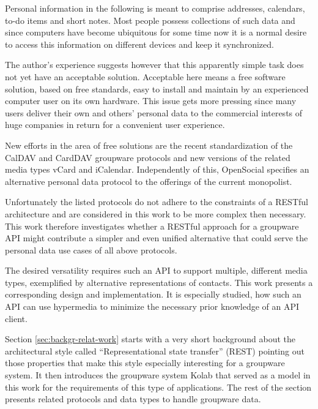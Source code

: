 \documentclass[11pt,a4paper,headsepline,twoside]{scrartcl}		%
\begin{document}



Personal information in the following is meant to comprise addresses, calendars,
to-do items and short notes. Most people possess collections of such data and
since computers have become ubiquitous for some time now it is a normal desire
to access this information on different devices and keep it synchronized.

The author's experience suggests however that this apparently simple task does
not yet have an acceptable solution. Acceptable here means a free software
solution, based on free standards, easy to install and maintain by an
experienced computer user on its own hardware. This issue gets more pressing
since many users deliver their own and others' personal data to the commercial
interests of huge companies in return for a convenient user experience.

New efforts in the area of free solutions are the recent standardization of the
CalDAV and CardDAV groupware protocols and new versions of the related media
types vCard and iCalendar. Independently of this, OpenSocial specifies an
alternative personal data protocol to the offerings of the current monopolist.

Unfortunately the listed protocols do not adhere to the constraints of a RESTful
architecture and are considered in this work to be more complex then necessary.
This work therefore investigates whether a RESTful approach for a groupware API
might contribute a simpler and even unified alternative that could serve the
personal data use cases of all above protocols.

The desired versatility requires such an API to support multiple, different
media types, exemplified by alternative representations of contacts. This work
presents a corresponding design and implementation. It is especially studied,
how such an API can use hypermedia to minimize the necessary prior knowledge of
an API client.

Section \ref{sec:backgr-relat-work} starts with a very short background about
the architectural style called ``Representational state transfer'' (REST)
pointing out those properties that make this style especially interesting for a
groupware system. It then introduces the groupware system Kolab that served as a
model in this work for the requirements of this type of applications. The rest
of the section presents related protocols and data types to handle groupware
data.
\end{document}
